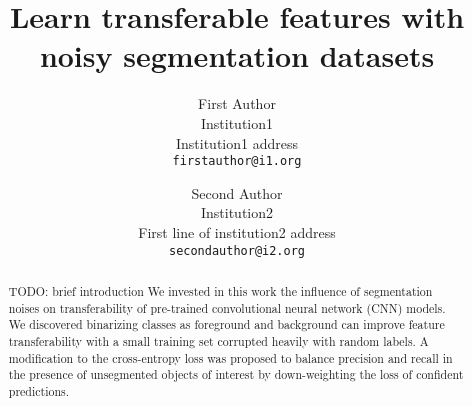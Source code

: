 \documentclass[10pt,twocolumn,letterpaper]{article}
\begin{document}
\onecolumn
{}


\twocolumn
{}
\newpage
\title{Learn transferable features with noisy segmentation datasets}

\author{First Author\\
Institution1\\
Institution1 address\\
{\tt\small firstauthor@i1.org}
\and
Second Author\\
Institution2\\
First line of institution2 address\\
{\tt\small secondauthor@i2.org}
}

\maketitle


\begin{abstract}
{TODO: brief introduction}
We invested in this work the influence of segmentation noises on transferability of pre-trained convolutional neural network (CNN) models.
We discovered binarizing classes as foreground and background can improve feature transferability with a small training set corrupted heavily with random labels.
A modification to the cross-entropy loss was proposed to balance precision and recall in the presence of unsegmented objects of interest by down-weighting the loss of confident predictions.

\end{abstract}

















{\small


}

\clearpage

\end{document}
